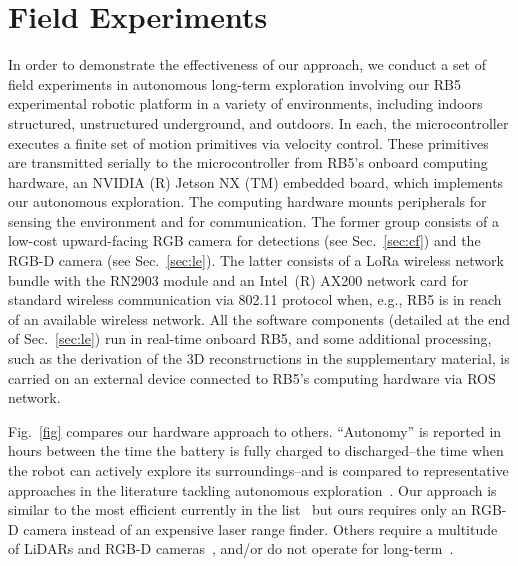 \documentclass[lettersize,journal,twoside]{IEEEtran}
\theoremstyle{definition}
\begin{document}
\section{Field Experiments}
\label{sec:fe}
\noindent
In order to demonstrate the effectiveness of our approach, we conduct a set of 
field experiments in autonomous long-term %
exploration involving our RB5 experimental robotic platform %
in a variety of environments, including indoors structured, unstructured underground, and outdoors. In each, the microcontroller executes a finite set of motion primitives via velocity control. These primitives are transmitted serially to the microcontroller 
from RB5's onboard computing hardware, an NVIDIA (R) Jetson NX (TM) embedded board, which implements our autonomous %
exploration. %
The computing hardware mounts peripherals for sensing the environment and for communication. The former group consists of a low-cost upward-facing RGB camera for detections (see Sec.~\ref{sec:cf}) and the RGB-D camera (see Sec.~\ref{sec:le}). The latter 
consists 
of a LoRa wireless network bundle with the RN2903 module and an Intel~(R) AX200 network card for standard wireless communication via 802.11 protocol when, e.g., RB5 is in reach of an available wireless network.
%
All the software components %
(detailed at the end of Sec.~\ref{sec:le}) run in real-time onboard RB5, and some additional processing, such as the derivation of the 3D reconstructions in the supplementary material, is carried on an external device connected to RB5's computing hardware via ROS network.

Fig.~\ref{fig} compares our hardware approach to others. 
``Autonomy'' is reported in hours between the time the battery is fully charged to discharged--the time when the robot can actively explore its surroundings--and is compared to representative approaches in the literature tackling autonomous exploration~\cite{schmid2020efficient,kulkarni2022autonomous,muller2021openbot,tranzatto2022cerberus,roucek2020darpa,surmann2003autonomous}.
Our approach is similar 
to the most efficient currently in the list~\cite{surmann2003autonomous} %
but ours requires only an RGB-D camera instead of an 
expensive %
laser range finder. Others require a multitude of LiDARs and RGB-D cameras~\cite{tranzatto2022cerberus,kulkarni2022autonomous,roucek2020darpa}, and/or do not operate for long-term~\cite{schmid2020efficient,muller2021openbot}.
\end{document}
